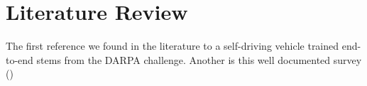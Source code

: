 \section{Literature Review}
The first reference we found in the literature to a self-driving vehicle trained end-to-end stems from the DARPA challenge.  
Another is this well documented survey (\cite{Grigorescu2020})
